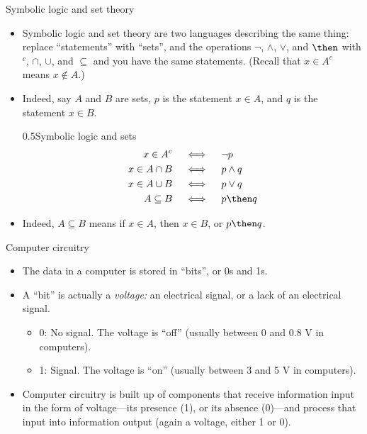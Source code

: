 \documentclass[12pt,aspectratio=1610, handout]{beamer}
\begin{document}

\begin{frame}{Symbolic logic and set theory}
	\begin{itemize}
		\item Symbolic logic and set theory are two languages describing the same thing: replace ``statements'' with ``sets'', and the operations $\neg$, $\wedge$, $\vee$, and $\then$ with $^c$, $\cap$, $\cup$, and $\subseteq$ and you have the same statements.
		(Recall that $x \in A^c$ means $x \not\in A$.)\p
		\item Indeed, say $A$ and $B$ are sets, $p$ is the statement $x \in A$, and $q$ is the statement $x \in B$. \p
		\begin{blockz}{0.5}{Symbolic logic and sets}\vspace{-5mm}\begin{align*}
				x \in A^c \quad &\iff \quad \neg p\\ 
				x \in A \cap B \quad &\iff \quad p \wedge q\\
				x \in A \cup B \quad &\iff \quad p \vee q\\
				A \subseteq B \quad & \iff \quad p \then q
		\end{align*}\end{blockz}\p
		\item Indeed, $A \subseteq B$ means if $x \in A$, then $x \in B$, or $p \then q$.
	\end{itemize}
\end{frame}



\begin{frame}{Computer circuitry}
	\begin{itemize}
		\item The data in a computer is stored in ``bits'', or 0s and 1s. 
		\item A ``bit'' is actually a \emph{voltage:} an electrical signal, or a lack of an electrical signal. 
		\begin{itemize}
			\item 0: No signal. The voltage is ``off'' (usually between 0 and 0.8 V in computers).
			\item 1: Signal. The voltage is ``on'' (usually between 3 and 5 V in computers). 
		\end{itemize}
		\item Computer circuitry is built up of components that receive information input in the form of voltage---its presence (1), or its absence (0)---and process that input into information output (again a voltage, either 1 or 0). 
	\end{itemize}
\end{frame}
\end{document}
